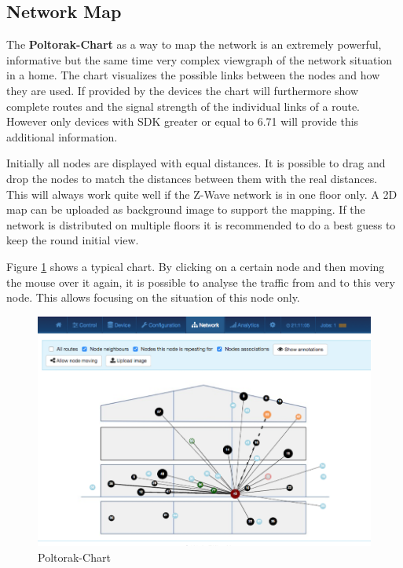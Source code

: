 {\subsection{Network Map}

The \textbf{Poltorak-Chart} as a way to map the network is an extremely powerful, informative but the same time very complex
viewgraph of the network situation in a home.  The chart visualizes the possible links between
the nodes and how they are used. If provided by the devices the chart will furthermore show
complete routes and the signal strength of the individual links of a route. However only 
devices with SDK greater or equal to 6.71 will provide this additional information.
 
Initially all nodes are displayed with equal distances. It is possible to drag and drop
the nodes to match the distances between them with the real distances. This will always 
work quite well if the Z-Wave network is in one floor only. 
A 2D map can be uploaded as background image to support the mapping.
If the network is distributed  on multiple floors it is recommended to do a best guess 
to keep the round initial view.

Figure \ref{c5:poltos} shows a typical chart. By clicking on a certain node and then 
moving the mouse over it again, it is possible to analyse the traffic from and to this 
very node. This allows focusing on the situation of this node only.

\begin{figure}
\begin{center}
\includegraphics[width=1.0\textwidth]{pngs/cap7/eui24.png}
\caption {Poltorak-Chart}
\label{c5:poltos}
\end{center}
\end{figure}

}
